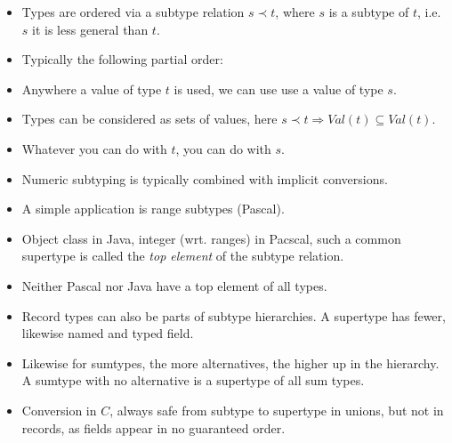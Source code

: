 \begin{itemize}

\item Types are ordered via a subtype relation $s \prec t$, where $s$ is a
subtype of $t$, i.e. $s$ it is less general than $t$.

\item Typically the following partial order:


\item Anywhere a value of type $t$ is used, we can use use a value of type $s$.

\item Types can be considered as sets of values, here $s \prec t \Rightarrow
Val(t) \subseteq Val(t)$.

\item Whatever you can do with $t$, you can do with $s$.

\item Numeric subtyping is typically combined with implicit conversions.

\item A simple application is range subtypes (Pascal).

\item Object class in Java, integer (wrt. ranges) in Pacscal, such a common
supertype is called the \emph{top element} of the subtype relation.

\item Neither Pascal nor Java have a top element of all types.

\item Record types can also be parts of subtype hierarchies. A supertype has
fewer, likewise named and typed field.

\item Likewise for sumtypes, the more alternatives, the higher up in the
hierarchy. A sumtype with no alternative is a supertype of all sum types.

\item Conversion in $C$, always safe from subtype to supertype in unions, but
not in records, as fields appear in no guaranteed order.

\end{itemize}

